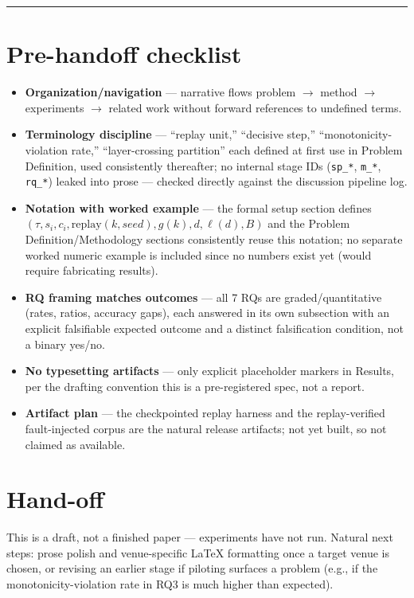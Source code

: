\documentclass[11pt]{article}
\begin{document}



\vspace{1em}
\hrule
\vspace{1em}

\section*{Pre-handoff checklist}
\begin{itemize}[leftmargin=1.4em]
\item \textbf{Organization/navigation} --- narrative flows problem $\to$ method $\to$ experiments $\to$ related work without forward references to undefined terms.
\item \textbf{Terminology discipline} --- ``replay unit,'' ``decisive step,'' ``monotonicity-violation rate,'' ``layer-crossing partition'' each defined at first use in Problem Definition, used consistently thereafter; no internal stage IDs (\texttt{sp\_*}, \texttt{m\_*}, \texttt{rq\_*}) leaked into prose --- checked directly against the discussion pipeline log.
\item \textbf{Notation with worked example} --- the formal setup section defines $(\tau, s_i, c_i, \mathrm{replay}(k,\mathit{seed}), g(k), d, \ell(d), B)$ and the Problem Definition/Methodology sections consistently reuse this notation; no separate worked numeric example is included since no numbers exist yet (would require fabricating results).
\item \textbf{RQ framing matches outcomes} --- all 7 RQs are graded/quantitative (rates, ratios, accuracy gaps), each answered in its own subsection with an explicit falsifiable expected outcome and a distinct falsification condition, not a binary yes/no.
\item \textbf{No typesetting artifacts} --- only explicit placeholder markers in Results, per the drafting convention this is a pre-registered spec, not a report.
\item \textbf{Artifact plan} --- the checkpointed replay harness and the replay-verified fault-injected corpus are the natural release artifacts; not yet built, so not claimed as available.
\end{itemize}

\section*{Hand-off}
This is a draft, not a finished paper --- experiments have not run. Natural next steps: prose polish and venue-specific LaTeX formatting once a target venue is chosen, or revising an earlier stage if piloting surfaces a problem (e.g., if the monotonicity-violation rate in RQ3 is much higher than expected).
\end{document}
